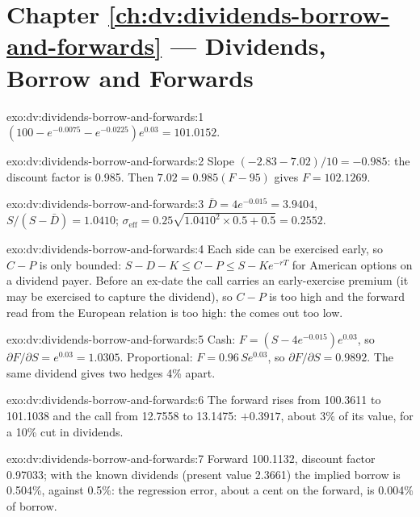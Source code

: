 \section*{Chapter \ref{ch:dv:dividends-borrow-and-forwards} --- Dividends, Borrow and Forwards}

\begin{solution}{exo:dv:dividends-borrow-and-forwards:1}
$(100-e^{-0.0075}-e^{-0.0225})e^{0.03}=101.0152$.
\end{solution}

\begin{solution}{exo:dv:dividends-borrow-and-forwards:2}
Slope $(-2.83-7.02)/10=-0.985$: the discount factor is 0.985. Then $7.02=0.985(F-95)$ gives
$F=102.1269$.
\end{solution}

\begin{solution}{exo:dv:dividends-borrow-and-forwards:3}
$\bar D=4e^{-0.015}=3.9404$, $S/(S-\bar D)=1.0410$;
$\sigma_{\mathrm{eff}}=0.25\sqrt{1.0410^2\times0.5+0.5}=0.2552$.
\end{solution}

\begin{solution}{exo:dv:dividends-borrow-and-forwards:4}
Each side can be exercised early, so $C-P$ is only bounded:
$S-D-K\le C-P\le S-Ke^{-rT}$ for American options on a dividend payer. Before an ex-date
the call carries an early-exercise premium (it may be exercised to capture the
dividend), so $C-P$ is too high and the forward read from the European relation is too
high: the  comes out too low.
\end{solution}

\begin{solution}{exo:dv:dividends-borrow-and-forwards:5}
Cash: $F=(S-4e^{-0.015})e^{0.03}$, so $\partial F/\partial S=e^{0.03}=1.0305$.
Proportional: $F=0.96\,Se^{0.03}$, so $\partial F/\partial S=0.9892$. The same dividend
gives two hedges 4\% apart.
\end{solution}

\begin{solution}{exo:dv:dividends-borrow-and-forwards:6}
The forward rises from 100.3611 to 101.1038 and the call from 12.7558 to 13.1475: $+0.3917$,
about 3\% of its value, for a 10\% cut in dividends.
\end{solution}

\begin{solution}{exo:dv:dividends-borrow-and-forwards:7}
Forward 100.1132, discount factor 0.97033; with the known dividends (present value 2.3661)
the implied borrow is 0.504\%, against 0.5\%: the regression error, about a cent on the
forward, is 0.004\% of borrow.
\end{solution}

